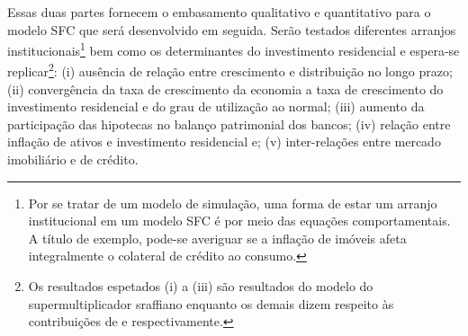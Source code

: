 Essas duas partes fornecem o embasamento qualitativo e quantitativo para o modelo SFC que será desenvolvido em seguida. Serão testados diferentes arranjos institucionais\footnote{Por se tratar de um modelo de simulação, uma forma de estar um arranjo institucional em um modelo SFC é por meio das equações comportamentais. A título de exemplo, pode-se averiguar se a inflação de imóveis afeta integralmente o colateral de crédito ao consumo.} bem como os determinantes do investimento residencial e espera-se replicar\footnote{Os resultados espetados (i) a (iii) são resultados do modelo do supermultiplicador sraffiano enquanto os demais dizem respeito às contribuições de \textcite{teixeira_crescimento_2015} e \textcite{jorda_great_2014} respectivamente.}: 
	(i) ausência de relação entre crescimento e distribuição no longo prazo; 
	(ii) convergência da taxa de crescimento da economia a taxa de crescimento do investimento residencial e do grau de utilização ao normal; 
	(iii) aumento da participação das hipotecas no balanço patrimonial dos bancos;
	(iv) relação entre inflação de ativos e investimento residencial e; 
	(v) inter-relações entre mercado imobiliário e de crédito. 


